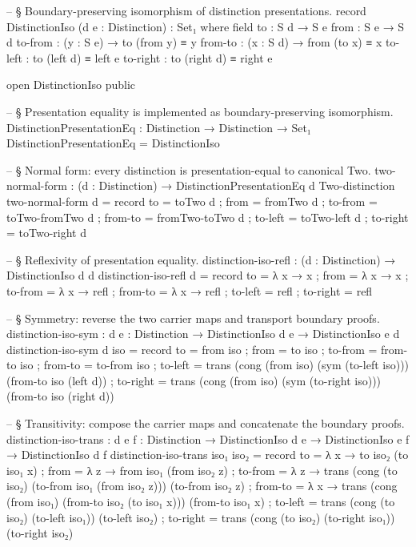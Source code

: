 \documentclass[11pt]{article}
\begin{document}
\begin{code}
-- § Boundary-preserving isomorphism of distinction presentations.
record DistinctionIso (d e : Distinction) : Set₁ where
  field
    to       : S d → S e
    from     : S e → S d
    to-from  : (y : S e) → to (from y) ≡ y
    from-to  : (x : S d) → from (to x) ≡ x
    to-left  : to (left d) ≡ left e
    to-right : to (right d) ≡ right e

open DistinctionIso public

-- § Presentation equality is implemented as boundary-preserving isomorphism.
DistinctionPresentationEq : Distinction → Distinction → Set₁
DistinctionPresentationEq = DistinctionIso

-- § Normal form: every distinction is presentation-equal to canonical Two.
two-normal-form : (d : Distinction) → DistinctionPresentationEq d Two-distinction
two-normal-form d = record
  { to       = toTwo d
  ; from     = fromTwo d
  ; to-from  = toTwo-fromTwo d
  ; from-to  = fromTwo-toTwo d
  ; to-left  = toTwo-left d
  ; to-right = toTwo-right d
  }

-- § Reflexivity of presentation equality.
distinction-iso-refl : (d : Distinction) → DistinctionIso d d
distinction-iso-refl d = record
  { to       = λ x → x
  ; from     = λ x → x
  ; to-from  = λ x → refl
  ; from-to  = λ x → refl
  ; to-left  = refl
  ; to-right = refl
  }

-- § Symmetry: reverse the two carrier maps and transport boundary proofs.
distinction-iso-sym : {d e : Distinction} → DistinctionIso d e → DistinctionIso e d
distinction-iso-sym {d} iso = record
  { to       = from iso
  ; from     = to iso
  ; to-from  = from-to iso
  ; from-to  = to-from iso
  ; to-left  = trans (cong (from iso) (sym (to-left iso))) (from-to iso (left d))
  ; to-right = trans (cong (from iso) (sym (to-right iso))) (from-to iso (right d))
  }

-- § Transitivity: compose the carrier maps and concatenate the boundary proofs.
distinction-iso-trans :
  {d e f : Distinction} →
  DistinctionIso d e → DistinctionIso e f → DistinctionIso d f
distinction-iso-trans iso₁ iso₂ = record
  { to       = λ x → to iso₂ (to iso₁ x)
  ; from     = λ z → from iso₁ (from iso₂ z)
  ; to-from  = λ z →
      trans (cong (to iso₂) (to-from iso₁ (from iso₂ z))) (to-from iso₂ z)
  ; from-to  = λ x →
      trans (cong (from iso₁) (from-to iso₂ (to iso₁ x))) (from-to iso₁ x)
  ; to-left  = trans (cong (to iso₂) (to-left iso₁)) (to-left iso₂)
  ; to-right = trans (cong (to iso₂) (to-right iso₁)) (to-right iso₂)
  }


\end{code}
\end{document}

